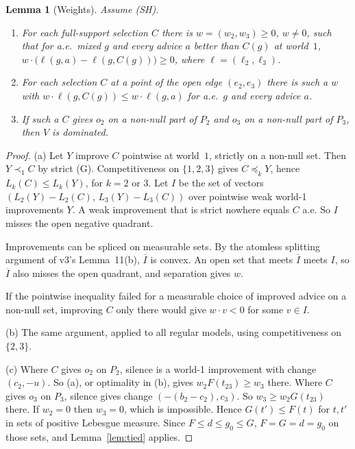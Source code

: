 \documentclass[11pt]{article}
\newtheorem{lemma}[theorem]{Lemma}
\theoremstyle{definition}\newtheorem{definition}[theorem]{Definition}
\theoremstyle{remark}\newtheorem{remark}[theorem]{Remark}
\begin{document}
\begin{lemma}[Weights]\label{lem:weights}
Assume (SH).
\begin{enumerate}[label=(\alph*)]
\item For each full-support selection $C$ there is $w=(w_2,w_3)\ge0$,
$w\ne0$, such that for a.e.\ mixed $g$ and every advice $a$ better than
$C(g)$ at world~$1$,
$w\cdot\bigl(\ell(g,a)-\ell(g,C(g))\bigr)\ge0$, where $\ell=(\ell_2,\ell_3)$.
\item For each selection $C$ at a point of the open edge $(e_2,e_3)$ there is
such a $w$ with $w\cdot\ell(g,C(g))\le w\cdot\ell(g,a)$ for a.e.\ $g$ and
every advice $a$.
\item If such a $C$ gives $o_2$ on a non-null part of $P_2$ and $o_3$ on a
non-null part of $P_3$, then $V$ is dominated.
\end{enumerate}
\end{lemma}
\begin{proof}
(a) Let $Y$ improve $C$ pointwise at world~$1$, strictly on a non-null set.
Then $Y\prec_1C$ by strict (G). Competitiveness on $\{1,2,3\}$ gives
$C\preceq_kY$, hence $L_k(C)\le L_k(Y)$, for $k=2$ or $3$. Let $I$ be the set of
vectors $(L_2(Y)-L_2(C),\,L_3(Y)-L_3(C))$ over pointwise weak world-1
improvements $Y$. A weak improvement that is strict nowhere equals $C$ a.e.
So $I$ misses the open negative quadrant.

Improvements can be spliced on measurable sets. By the atomless splitting
argument of v3's Lemma~11(b), $\overline I$ is convex. An open set that meets
$\overline I$ meets $I$, so $\overline I$ also misses the open quadrant, and
separation gives $w$.

If the pointwise inequality failed for a measurable choice of improved advice
on a non-null set, improving $C$ only there would give $w\cdot v<0$ for some
$v\in I$.

(b) The same argument, applied to all regular models, using competitiveness on
$\{2,3\}$.

(c) Where $C$ gives $o_2$ on $P_2$, silence is a world-1 improvement with
change $(c_2,-u)$. So (a), or optimality in (b), gives $w_2F(t_{23})\ge w_3$
there. Where $C$ gives $o_3$ on $P_3$, silence gives change
$(-(b_2-c_2),c_3)$. So $w_3\ge w_2G(t_{23})$ there. If $w_2=0$ then $w_3=0$,
which is impossible. Hence $G(t')\le F(t)$ for $t,t'$ in sets of positive
Lebesgue measure. Since $F\le d\le g_0\le G$, $F=G=d=g_0$ on those sets, and
Lemma~\ref{lem:tied} applies.
\end{proof}
\end{document}
